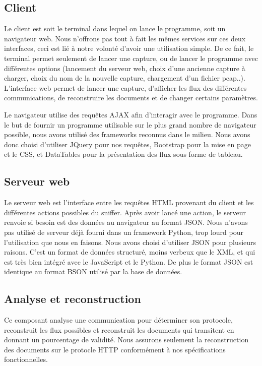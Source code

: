 \subsection{Client}
Le client est soit le terminal dans lequel on lance le programme, soit un navigateur web. Nous n'offrons pas tout à fait les mêmes services sur ces deux interfaces, ceci est lié à notre volonté d'avoir une utilisation simple. 
De ce fait, le terminal permet seulement de lancer une capture, ou de lancer le programme avec différentes options (lancement du serveur web, choix d'une ancienne capture à charger, choix du nom de la nouvelle capture, chargement d'un fichier pcap..).
L'interface web permet de lancer une capture, d'afficher les flux des différentes communications, de reconstruire les documents et de changer certains paramètres.

Le navigateur utilise des requêtes AJAX afin d'interagir avec  le programme.
Dans le but de fournir un programme utilisable sur le plus grand nombre de navigateur possible, nous avons utilisé des frameworks reconnus dans le milieu. Nous avons donc choisi d'utiliser JQuery pour nos requêtes, Bootstrap pour la mise en page et le CSS, et DataTables pour la présentation des flux sous forme de tableau. 

\subsection{Serveur web}
Le serveur web est l'interface entre les requêtes HTML provenant du client et les différentes actions possibles du sniffer. Après avoir lancé une action, le serveur renvoie si besoin est des données au navigateur au format
JSON. Nous n'avons pas utilisé de serveur déjà fourni dans un framework Python, trop lourd pour l'utilisation que nous en faisons.
Nous avons choisi d'utiliser JSON pour plusieurs raisons. C'est un format de données structuré, moins verbeux que le XML, et qui est très bien intégré avec le JavaScript et le Python. De plus le format JSON est identique au format BSON utilisé par la base de données. 

\subsection{Analyse et reconstruction}
Ce composant analyse une communication pour déterminer son protocole, reconstruit les flux possibles et reconstruit les documents qui transitent en donnant un pourcentage de validité. Nous assurons seulement la reconstruction des documents sur le protocle HTTP conformément à nos spécifications fonctionnelles.

